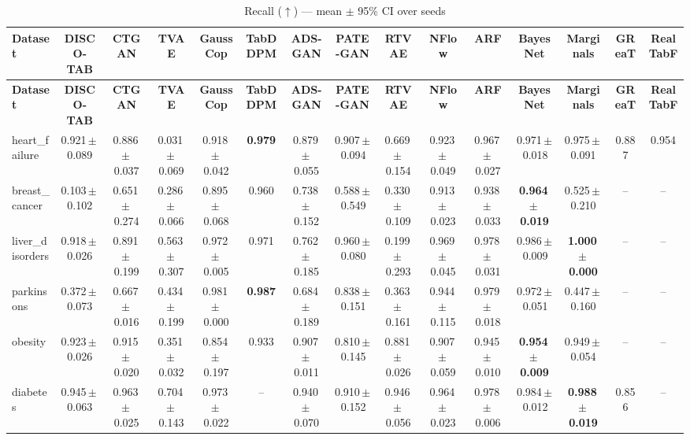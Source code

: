 \documentclass[8pt]{extarticle}
\begin{document}
\begin{longtable}{l*{14}{c}}
\caption{Recall ($\uparrow$) --- mean $\pm$ 95\% CI over seeds}\\
\toprule
\textbf{Dataset} & \textbf{DISCO-TAB} & \textbf{CTGAN} & \textbf{TVAE} & \textbf{GaussCop} & \textbf{TabDDPM} & \textbf{ADS-GAN} & \textbf{PATE-GAN} & \textbf{RTVAE} & \textbf{NFlow} & \textbf{ARF} & \textbf{BayesNet} & \textbf{Marginals} & \textbf{GReaT} & \textbf{RealTabF} \\
\midrule
\endfirsthead
\toprule
\textbf{Dataset} & \textbf{DISCO-TAB} & \textbf{CTGAN} & \textbf{TVAE} & \textbf{GaussCop} & \textbf{TabDDPM} & \textbf{ADS-GAN} & \textbf{PATE-GAN} & \textbf{RTVAE} & \textbf{NFlow} & \textbf{ARF} & \textbf{BayesNet} & \textbf{Marginals} & \textbf{GReaT} & \textbf{RealTabF} \\
\midrule
\endhead
\bottomrule
\endfoot
heart\_failure & 0.921\,$\pm$\,0.089 & 0.886\,$\pm$\,0.037 & 0.031\,$\pm$\,0.069 & 0.918\,$\pm$\,0.042 & \textbf{0.979} & 0.879\,$\pm$\,0.055 & 0.907\,$\pm$\,0.094 & 0.669\,$\pm$\,0.154 & 0.923\,$\pm$\,0.049 & 0.967\,$\pm$\,0.027 & 0.971\,$\pm$\,0.018 & 0.975\,$\pm$\,0.091 & 0.887 & 0.954 \\
breast\_cancer & 0.103\,$\pm$\,0.102 & 0.651\,$\pm$\,0.274 & 0.286\,$\pm$\,0.066 & 0.895\,$\pm$\,0.068 & 0.960 & 0.738\,$\pm$\,0.152 & 0.588\,$\pm$\,0.549 & 0.330\,$\pm$\,0.109 & 0.913\,$\pm$\,0.023 & 0.938\,$\pm$\,0.033 & \textbf{0.964\,$\pm$\,0.019} & 0.525\,$\pm$\,0.210 & -- & -- \\
liver\_disorders & 0.918\,$\pm$\,0.026 & 0.891\,$\pm$\,0.199 & 0.563\,$\pm$\,0.307 & 0.972\,$\pm$\,0.005 & 0.971 & 0.762\,$\pm$\,0.185 & 0.960\,$\pm$\,0.080 & 0.199\,$\pm$\,0.293 & 0.969\,$\pm$\,0.045 & 0.978\,$\pm$\,0.031 & 0.986\,$\pm$\,0.009 & \textbf{1.000\,$\pm$\,0.000} & -- & -- \\
parkinsons & 0.372\,$\pm$\,0.073 & 0.667\,$\pm$\,0.016 & 0.434\,$\pm$\,0.199 & 0.981\,$\pm$\,0.000 & \textbf{0.987} & 0.684\,$\pm$\,0.189 & 0.838\,$\pm$\,0.151 & 0.363\,$\pm$\,0.161 & 0.944\,$\pm$\,0.115 & 0.979\,$\pm$\,0.018 & 0.972\,$\pm$\,0.051 & 0.447\,$\pm$\,0.160 & -- & -- \\
obesity & 0.923\,$\pm$\,0.026 & 0.915\,$\pm$\,0.020 & 0.351\,$\pm$\,0.032 & 0.854\,$\pm$\,0.197 & 0.933 & 0.907\,$\pm$\,0.011 & 0.810\,$\pm$\,0.145 & 0.881\,$\pm$\,0.026 & 0.907\,$\pm$\,0.059 & 0.945\,$\pm$\,0.010 & \textbf{0.954\,$\pm$\,0.009} & 0.949\,$\pm$\,0.054 & -- & -- \\
diabetes & 0.945\,$\pm$\,0.063 & 0.963\,$\pm$\,0.025 & 0.704\,$\pm$\,0.143 & 0.973\,$\pm$\,0.022 & -- & 0.940\,$\pm$\,0.070 & 0.910\,$\pm$\,0.152 & 0.946\,$\pm$\,0.056 & 0.964\,$\pm$\,0.023 & 0.978\,$\pm$\,0.006 & 0.984\,$\pm$\,0.012 & \textbf{0.988\,$\pm$\,0.019} & 0.856 & -- \\

\end{longtable}
\end{document}
